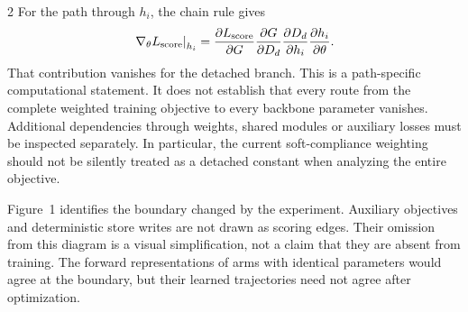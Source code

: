 \documentclass[a4paper,10pt]{article}
\renewcommand{\small}{\fontsize{8}{12}\selectfont}
\newcommand{\sg}{\operatorname{sg}}
\begin{document}
\begin{multicols}{2}
For the path through $h_i$, the chain rule gives
\begin{equation}
\left.\nabla_\theta L_{\rm score}\right|_{h_i}
=\frac{\partial L_{\rm score}}{\partial G}
\frac{\partial G}{\partial D_d}
\frac{\partial D_d}{\partial h_i}
\frac{\partial h_i}{\partial\theta}.
\label{eq:chain}
\end{equation}
That contribution vanishes for the detached branch. This is a path-specific computational statement. It does not establish that every route from the complete weighted training objective to every backbone parameter vanishes. Additional dependencies through weights, shared modules or auxiliary losses must be inspected separately. In particular, the current soft-compliance weighting should not be silently treated as a detached constant when analyzing the entire objective.

\begin{center}
\end{center}
Figure~1 identifies the boundary changed by the experiment. Auxiliary objectives and deterministic store writes are not drawn as scoring edges. Their omission from this diagram is a visual simplification, not a claim that they are absent from training. The forward representations of arms with identical parameters would agree at the boundary, but their learned trajectories need not agree after optimization.


\end{multicols}
\end{document}
